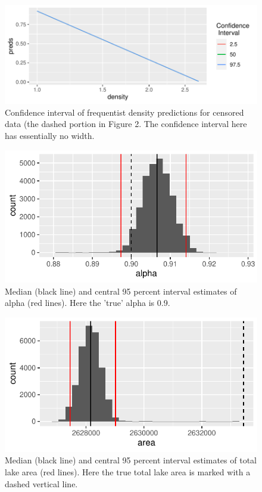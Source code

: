 \documentclass{article}
\begin{document}
\begin{figure}
	\centering
	\includegraphics{figures/frequentist_uncertainty-1}
	\caption{Confidence interval of frequentist density predictions for censored data (the dashed portion in Figure 2. The confidence interval here has essentially no width.}
	\label{fig:frequentist_uncertainty}
\end{figure}

\begin{figure}
	\centering
	\includegraphics{figures/bayesian_model-1}
	\caption{Median (black line) and central 95 percent interval estimates of alpha (red lines). Here the 'true' alpha is 0.9.}
	\label{fig:bayesian_model}
\end{figure}

\begin{figure}
	\centering
	\includegraphics{figures/bayesian_area-1}
	\caption{Median (black line) and central 95 percent interval estimates of total lake area (red lines). Here the true total lake area is marked with a dashed vertical line.}
	\label{fig:bayesian_area}
\end{figure}
\end{document}
